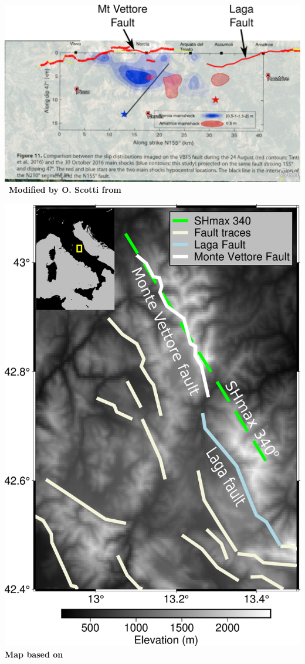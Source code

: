 \documentclass{beamer}
\begin{document}
\begin{frame}
 \begin{center}
 \begin{minipage}{0.65\linewidth}
  \includegraphics[width=1\linewidth]{images/amatrice_1.pdf} \,
  \vskip 0.2cm
  {\bf \tiny Modified by O. Scotti from \cite{Scognamiglio_2018_CFG}} \end{minipage}
 \begin{minipage}{0.33\linewidth}
  \includegraphics[width=1\linewidth]{images/Map_Italy.png}  
  \vskip 0.2cm
  {\bf \tiny Map based on \cite{Walker_2021_FAULT2SHA}} \end{minipage}
 \end{center}

  
\end{frame}
\end{document}
